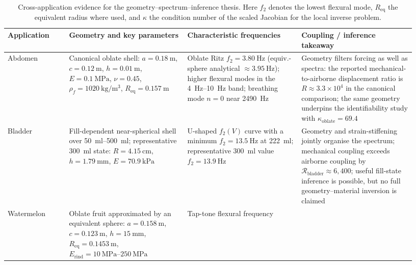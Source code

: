 \begin{table}[t]
  \centering
  \small
  \caption{Cross-application evidence for the geometry--spectrum--inference
  thesis.  Here $f_2$ denotes the lowest flexural mode, $R_\mathrm{eq}$ the
  equivalent radius where used, and $\kappa$ the condition number of the scaled
  Jacobian for the local inverse problem.}
  \label{tab:cross_application_evidence}
  \renewcommand{\arraystretch}{1.15}
  \begin{tabular}{@{}p{0.14\linewidth}p{0.27\linewidth}p{0.26\linewidth}p{0.26\linewidth}@{}}
    \toprule
    Application & Geometry and key parameters & Characteristic frequencies & Coupling / inference takeaway \\
    \midrule
    Abdomen
    &
    Canonical oblate shell:
    $a=\SI{0.18}{\metre}$,
    $c=\SI{0.12}{\metre}$,
    $h=\SI{0.01}{\metre}$,
    $E=\SI{0.1}{\mega\pascal}$,
    $\nu=0.45$,
    $\rho_f=\SI{1020}{\kilogram\per\metre\cubed}$,
    $R_\mathrm{eq}=\SI{0.157}{\metre}$
    &
    Oblate Ritz $f_2=\SI{3.80}{\hertz}$
    (equiv.-sphere analytical $\approx\SI{3.95}{\hertz}$);
    higher flexural modes in the \SIrange{4}{10}{\hertz} band;
    breathing mode $n=0$ near \SI{2490}{\hertz}
    &
    Geometry filters forcing as well as spectra:
    the reported mechanical-to-airborne displacement ratio is
    $R \approx 3.3\times 10^4$ in the canonical comparison;
    the same geometry underpins the identifiability study with
    $\kappa_\mathrm{oblate}=69.4$
    \\
    \addlinespace
    Bladder
    &
    Fill-dependent near-spherical shell over
    \SIrange{50}{500}{\milli\litre};
    representative \SI{300}{\milli\litre} state:
    $R=\SI{4.15}{\centi\metre}$,
    $h=\SI{1.79}{\milli\metre}$,
    $E=\SI{70.9}{\kilo\pascal}$
    &
    U-shaped $f_2(V)$ curve with a minimum
    $f_2=\SI{13.5}{\hertz}$ at \SI{222}{\milli\litre};
    representative \SI{300}{\milli\litre} value
    $f_2=\SI{13.9}{\hertz}$
    &
    Geometry and strain-stiffening jointly organise the spectrum;
    mechanical coupling exceeds airborne coupling by
    $\mathcal{R}_\mathrm{bladder}\approx 6{,}400$;
    useful fill-state inference is possible, but no full
    geometry--material inversion is claimed
    \\
    \addlinespace
    Watermelon
    &
    Oblate fruit approximated by an equivalent sphere:
    $a=\SI{0.158}{\metre}$,
    $c=\SI{0.123}{\metre}$,
    $h=\SI{15}{\milli\metre}$,
    $R_\mathrm{eq}=\SI{0.1453}{\metre}$,
    $E_\mathrm{rind}=\SIrange{10}{250}{\mega\pascal}$
    &
    Tap-tone flexural frequency

\end{tabular}
\end{table}
